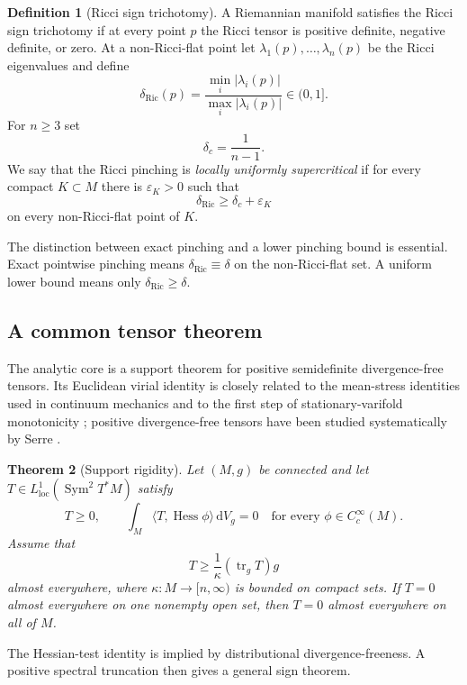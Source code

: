 \documentclass[11pt,reqno]{amsart}
\newtheorem{theorem}{Theorem}[section]
\theoremstyle{definition}
\newtheorem{definition}[theorem]{Definition}
\theoremstyle{remark}
\newcommand{\tr}{\operatorname{tr}}
\newcommand{\Hess}{\operatorname{Hess}}
\newcommand{\dd}{\,\mathrm d}
\newcommand{\dric}{\delta_{\mathrm{Ric}}}
\newcommand{\abs}[1]{\lvert #1\rvert}
\newcommand{\inner}[2]{\langle #1,#2\rangle}
\newcommand{\eps}{\varepsilon}
\begin{document}
\begin{definition}[Ricci sign trichotomy]
A Riemannian manifold satisfies the Ricci sign trichotomy if at every point $p$ the Ricci tensor is positive definite, negative definite, or zero.  At a non-Ricci-flat point let $\lambda_1(p),\dots,\lambda_n(p)$ be the Ricci eigenvalues and define
\[
\dric(p)=\frac{\min_i\abs{\lambda_i(p)}}{\max_i\abs{\lambda_i(p)}}\in(0,1].
\]
For $n\ge3$ set
\begin{equation}\label{eq:critical}
\delta_c=\frac1{n-1}.
\end{equation}
We say that the Ricci pinching is \emph{locally uniformly supercritical} if for every compact $K\subset M$ there is $\eps_K>0$ such that
\[
\dric\ge \delta_c+\eps_K
\]
on every non-Ricci-flat point of $K$.
\end{definition}

The distinction between exact pinching and a lower pinching bound is essential.  Exact pointwise pinching means $\dric\equiv\delta$ on the non-Ricci-flat set.  A uniform lower bound means only $\dric\ge\delta$.

\subsection{A common tensor theorem}

The analytic core is a support theorem for positive semidefinite divergence-free tensors.  Its Euclidean virial identity is closely related to the mean-stress identities used in continuum mechanics and to the first step of stationary-varifold monotonicity \cite{Allard}; positive divergence-free tensors have been studied systematically by Serre \cite{Serre2018,Serre2022}.

\begin{theorem}[Support rigidity]\label{thm:support-intro}
Let $(M,g)$ be connected and let $T\in L^1_{\mathrm{loc}}(\operatorname{Sym}^2T^*M)$ satisfy
\[
T\ge0,
\qquad
\int_M\inner{T}{\Hess\phi}\dd V_g=0
\quad\text{for every }\phi\in C_c^\infty(M).
\]
Assume that
\begin{equation}\label{eq:trace-ell-intro}
T\ge \frac1\kappa(\tr_gT)g
\end{equation}
almost everywhere, where $\kappa:M\to[n,\infty)$ is bounded on compact sets.  If $T=0$ almost everywhere on one nonempty open set, then $T=0$ almost everywhere on all of $M$.
\end{theorem}

The Hessian-test identity is implied by distributional divergence-freeness.  A positive spectral truncation then gives a general sign theorem.
\end{document}
